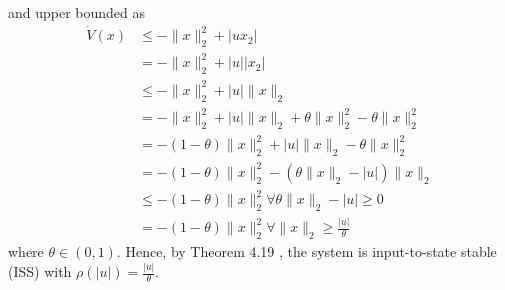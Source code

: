 \documentclass{article}
\begin{document}
\begin{frm-ex}
$$$$
and upper bounded as
$$
	\begin{aligned}
		\dot{V}(x) & \leq-\|x\|_2^2+\left|u x_2\right|                            \\
		           & =-\|x\|_2^2+|u|\left|x_2\right|                              \\
		           & \leq-\|x\|_2^2+|u|\|x\|_2                                    \\
		           & =-\|x\|_2^2+|u|\|x\|_2+\theta\|x\|_2^2-\theta\|x\|_2^2       \\
		           & =-(1-\theta)\|x\|_2^2+|u|\|x\|_2-\theta\|x\|_2^2             \\
		           & =-(1-\theta)\|x\|_2^2-\left(\theta\|x\|_2-|u|\right)\|x\|_2  \\
		           & \leq-(1-\theta)\|x\|_2^2 \forall \theta\|x\|_2-|u| \geq 0    \\
		           & =-(1-\theta)\|x\|_2^2 \forall\|x\|_2 \geq \frac{|u|}{\theta}
	\end{aligned}
$$
where $\theta \in(0,1)$. Hence, by Theorem 4.19 , the system is input-to-state stable (ISS) with $\rho(|u|)=\frac{|u|}{\theta}$.
\end{frm-ex}
\end{document}
